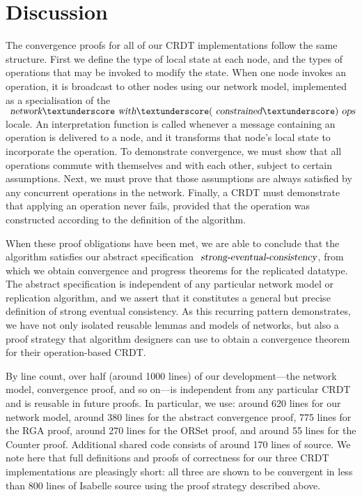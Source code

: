 \documentclass[acmlarge,review,anonymous]{acmart}
\begin{document}
\section{Discussion}
\label{sect.discussion}

The convergence proofs for all of our CRDT implementations follow the same structure.
First we define the type of local state at each node, and the types of operations that may be invoked to modify the state.
When one node invokes an operation, it is broadcast to other nodes using our network model, implemented as a specialisation of the $\isa{network}{\isacharunderscore}\isa{with}{\isacharunderscore}(\isa{constrained}{\isacharunderscore})\isa{ops}$ locale.
An interpretation function is called whenever a message containing an operation is delivered to a node, and it transforms that node's local state to incorporate the operation.
To demonstrate convergence, we must show that all operations commute with themselves and with each other, subject to certain assumptions.
Next, we must prove that those assumptions are always satisfied by any concurrent operations in the network.
Finally, a CRDT must demonstrate that applying an operation never fails, provided that the operation was constructed according to the definition of the algorithm.

When these proof obligations have been met, we are able to conclude that the algorithm satisfies our abstract specification $\isa{strong-eventual-consistency}$, from which we obtain convergence and progress theorems for the replicated datatype.
The abstract specification is independent of any particular network model or replication algorithm, and we assert that it constitutes a general but precise definition of strong eventual consistency.
As this recurring pattern demonstrates, we have not only isolated reusable lemmas and models of networks, but also a proof strategy that algorithm designers can use to obtain a convergence theorem for their operation-based CRDT.

By line count, over half (around 1000 lines) of our development---the network model, convergence proof, and so on---is independent from any particular CRDT and is reusable in future proofs.
In particular, we use: around 620 lines for our network model, around 380 lines for the abstract convergence proof, 775 lines for the RGA proof, around 270 lines for the ORSet proof, and around 55 lines for the Counter proof.
Additional shared code consists of around 170 lines of source.
We note here that full definitions and proofs of correctness for our three CRDT implementations are pleasingly short: all three are shown to be convergent in less than 800 lines of Isabelle source using the proof strategy described above. 
\end{document}
